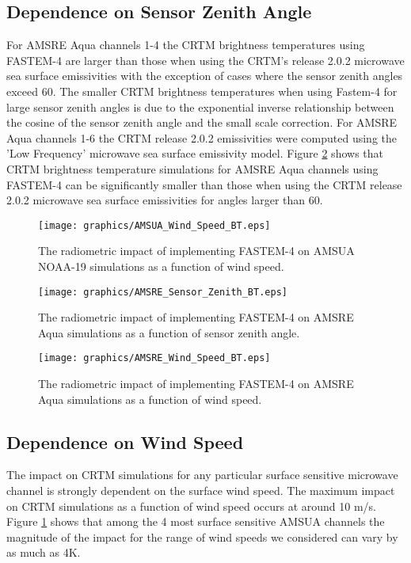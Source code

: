 \subsection{Dependence on Sensor Zenith Angle}
For AMSRE Aqua channels 1-4 the CRTM brightness temperatures using FASTEM-4 are larger than those when using the CRTM's release 2.0.2 microwave sea surface emissivities with the exception of cases where the sensor zenith angles exceed 60.  The smaller CRTM brightness temperatures when using Fastem-4 for large sensor zenith angles is due to the exponential inverse relationship between the cosine of the sensor zenith angle and the small scale correction.  For AMSRE Aqua channels 1-6 the CRTM release 2.0.2 emissivities were computed using the 'Low Frequency' microwave sea surface emissivity model.  Figure \ref{fig:AMSRE_Sensor_Zenith_Impact} shows that CRTM brightness temperature simulations for AMSRE Aqua channels using FASTEM-4 can be significantly smaller than those when using the CRTM release 2.0.2 microwave sea surface emissivities for angles larger than 60.  

\begin{figure}[htp]
  \centering
  \texttt{[image: graphics/AMSUA\_Wind\_Speed\_BT.eps]}
  \caption{The radiometric impact of implementing FASTEM-4 on AMSUA NOAA-19 simulations as a function of wind speed.}
  \label{fig:AMSUA_Wind_Speed_Impact}
\end{figure}

\newpage

\begin{figure}[htp]
  \centering
  \texttt{[image: graphics/AMSRE\_Sensor\_Zenith\_BT.eps]}
  \caption{The radiometric impact of implementing FASTEM-4 on AMSRE Aqua simulations as a function of sensor zenith angle.}
  \label{fig:AMSRE_Sensor_Zenith_Impact}
\end{figure}

\begin{figure}[htp]
  \centering
  \texttt{[image: graphics/AMSRE\_Wind\_Speed\_BT.eps]}
  \caption{The radiometric impact of implementing FASTEM-4 on AMSRE Aqua simulations as a function of wind speed.}
  \label{fig:AMSRE_Wind_Speed_Impact}
\end{figure}


\subsection{Dependence on Wind Speed}
The impact on CRTM simulations for any particular surface sensitive microwave channel is strongly dependent on the surface wind speed.  The maximum impact on CRTM simulations as a function of wind speed occurs at around 10 m/s.  Figure \ref{fig:AMSUA_Wind_Speed_Impact} shows that among the 4 most surface sensitive AMSUA channels the magnitude of the impact for the range of wind speeds we considered can vary by as much as 4K.  


